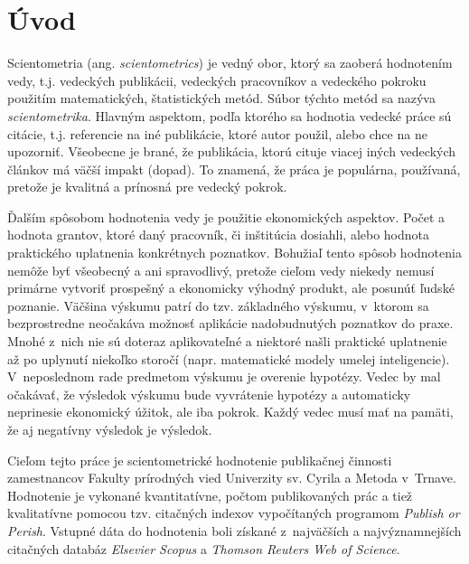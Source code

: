 \chapter*{Úvod}

Scientometria (ang. {\em scientometrics}) je vedný obor, ktorý sa zaoberá
hodnotením vedy, t.j. vedeckých publikácii, vedeckých pracovníkov a vedeckého
pokroku použitím matematických, štatistických metód.  Súbor týchto metód sa
nazýva {\em scientometrika}.  Hlavným aspektom, podľa ktorého sa hodnotia
vedecké práce sú citácie, t.j. referencie na iné publikácie, ktoré autor použil,
alebo chce na ne upozorniť.  Všeobecne je brané, že publikácia, ktorú cituje
viacej iných vedeckých článkov má väčší impakt (dopad).  To znamená, že práca je
populárna, používaná, pretože je kvalitná a prínosná pre vedecký pokrok.

Ďalším spôsobom hodnotenia vedy je použitie ekonomických aspektov.  Počet a
hodnota grantov, ktoré daný pracovník, či inštitúcia dosiahli, alebo hodnota
praktického uplatnenia konkrétnych poznatkov.  Bohužiaľ tento spôsob hodnotenia
nemôže byť všeobecný a ani spravodlivý, pretože cieľom vedy niekedy nemusí
primárne vytvoriť prospešný a ekonomicky výhodný produkt, ale posunúť ľudské
poznanie.  Väčšina výskumu patrí do tzv.  základného výskumu, v~ktorom sa
bezprostredne neočakáva možnosť aplikácie nadobudnutých poznatkov do
praxe. Mnohé z~nich nie sú doteraz aplikovateľné a niektoré našli praktické
uplatnenie až po uplynutí niekoľko storočí (napr. matematické modely umelej
inteligencie).  V~neposlednom rade predmetom výskumu je overenie hypotézy.
Vedec by mal očakávať, že výsledok výskumu bude vyvrátenie hypotézy a
automaticky neprinesie ekonomický úžitok, ale iba pokrok.  Každý vedec musí mať
na pamäti, že aj negatívny výsledok je výsledok.

Cieľom tejto práce je scientometrické hodnotenie publikačnej činnosti
zamestnancov Fakulty prírodných vied Univerzity sv. Cyrila a Metoda v~Trnave.
Hodnotenie je vykonané kvantitatívne, počtom publikovaných prác a tiež
kvalitatívne pomocou tzv. citačných indexov vypočítaných programom {\em Publish
  or Perish}.  Vstupné dáta do hodnotenia boli získané z~najväčších a
najvýznamnejších citačných databáz {\em Elsevier Scopus} a {\em Thomson Reuters
  Web of Science}.


